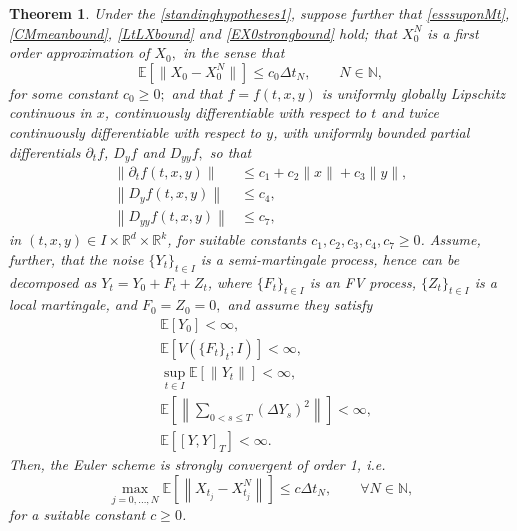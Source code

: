 \documentclass[reqno,12pt]{amsart}
\theoremstyle{plain} %
\newtheorem{theorem}{Theorem}[section]
\theoremstyle{definition} %
\begin{document}
\begin{theorem}
    \label{thmsemimartingaleunif}
    Under the \cref{standinghypotheses1}, suppose further that \eqref{esssuponMt}, \eqref{CMmeanbound}, \eqref{LtLXbound} and \eqref{EX0strongbound} hold; that $X_0^N$ is a first order approximation of $X_0,$ in the sense that 
    \begin{equation}
        \label{EX0X0Nunif}
        \mathbb{E}[\|X_0 - X_0^N\|] \leq c_0 \Delta t_N, \qquad N\in \mathbb{N},
    \end{equation}
    for some constant $c_0 \geq 0;$ and that $f=f(t, x, y)$ is uniformly globally Lipschitz continuous in $x$, continuously differentiable with respect to $t$ and twice continuously differentiable with respect to $y$, with uniformly bounded partial differentials $\partial_t f$, $D_y f$ and $D_{yy} f,$ so that
    \begin{align}
        \label{ftfyunifboundcadlagfvpartialt}
        \left\|\partial_t f(t, x, y)\right\| & \leq c_1 + c_2\|x\| + c_3\|y\|, \\
        \label{ftfyunifboundcadlagfvpartialy}
        \left\|D_y f(t, x, y)\right\| & \leq c_4, \\
        \label{ftfyunifboundcadlagfvpartialyy}
        \left\|D_{yy} f(t, x, y)\right\| & \leq c_7,
    \end{align}
    in $(t, x, y)\in I\times \mathbb{R}^d\times \mathbb{R}^k$, for suitable constants $c_1, c_2, c_3, c_4, c_7 \geq 0$. Assume, further, that the noise $\{Y_t\}_{t\in I}$ is a semi-martingale process, hence can be decomposed as $Y_t = Y_0 + F_t + Z_t$, where $\{F_t\}_{t\in I}$ is an FV process, $\{Z_t\}_{t\in I}$ is a local martingale, and $F_0 = Z_0 = 0,$ and assume they satisfy
    \begin{align}
        \label{Y0finiteexpectation}
        & \mathbb{E}\left[Y_0\right] < \infty, \\
        \label{expectFVFtfinite}
        & \mathbb{E}\left[V(\{F_t\}_t; I)\right] < \infty, \\
        \label{expectZtfinite}
        & \sup_{t\in I} \mathbb{E}\left[\|Y_t\|\right] < \infty, \\
        \label{expectquadraticjumptsfinite}
        & \mathbb{E}\left[\left\|\sum_{0 < s \leq T}\left( \Delta Y_s \right)^2\right\|\right] < \infty, \\
        \label{expectquadraticvarfinite}
        & \mathbb{E}[[Y, Y]_T] < \infty.
    \end{align}   
    Then, the Euler scheme is strongly convergent of order 1, i.e.
    \begin{equation}
        \label{ordersemimartingaleunif}
        \max_{j=0, \ldots, N} \mathbb{E}\left[\left\| X_{t_j} - X_{t_j}^N \right\|\right] \leq c \Delta t_N, \qquad \forall N \in \mathbb{N},
    \end{equation}
    for a suitable constant $c\geq 0$.
\end{theorem}
\end{document}

